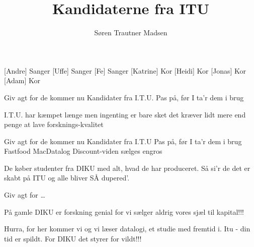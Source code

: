 \documentclass{article}
\title{Kandidaterne fra ITU}
\author{Søren Trautner Madsen}
\begin{document}
\maketitle

\begin{roles}
 [Andre] Sanger
 [Uffe] Sanger
 [Fe] Sanger
 [Katrine] Kor
 [Heidi] Kor
 [Jonas] Kor
 [Adam] Kor
\end{roles}

\begin{song}

Giv agt for de kommer nu
Kandidater fra I.T.U.
Pas på, før I ta'r dem i brug

I.T.U. har kæmpet længe
men ingenting er bare sket
det kræver lidt mere end penge
at lave forsknings-kvalitet

Giv agt for de kommer nu
Kandidater fra I.T.U
Pas på, før I ta'r dem i brug
Fastfood MacDatalog
Discount-viden sælges engros

De køber studenter fra DIKU
med alt, hvad de har produceret.
Så si'r de det er skabt på ITU
og alle bliver SÅ dupered'.

 Giv agt for \ldots

 På gamle DIKU
er forskning genial
for vi sælger aldrig
vores sjæl til kapital!!!

Hurra, for her kommer vi
og vi læser datalogi,
et studie med fremtid i.
Itu - din tid er spildt.
For DIKU det styrer for vildt!!!


\end{song}
\end{document}
